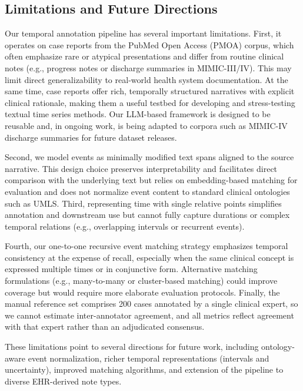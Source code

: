 \documentclass[pdflatex,sn-mathphys-num]{sn-jnl}%
\theoremstyle{thmstyleone}%
\theoremstyle{thmstyletwo}%
\theoremstyle{thmstylethree}%
\begin{document}

\subsection{Limitations and Future Directions}
\label{sec:limitations-and-future-directions}

Our temporal annotation pipeline has several important limitations. First, it operates on case reports from the PubMed Open Access (PMOA) corpus, which often emphasize rare or atypical presentations and differ from routine clinical notes (e.g., progress notes or discharge summaries in MIMIC-III/IV). This may limit direct generalizability to real-world health system documentation. At the same time, case reports offer rich, temporally structured narratives with explicit clinical rationale, making them a useful testbed for developing and stress-testing textual time series methods. Our LLM-based framework is designed to be reusable and, in ongoing work, is being adapted to corpora such as MIMIC-IV discharge summaries for future dataset releases.

Second, we model events as minimally modified text spans aligned to the source narrative. This design choice preserves interpretability and facilitates direct comparison with the underlying text but relies on embedding-based matching for evaluation and does not normalize event content to standard clinical ontologies such as UMLS. Third, representing time with single relative points simplifies annotation and downstream use but cannot fully capture durations or complex temporal relations (e.g., overlapping intervals or recurrent events).

Fourth, our one-to-one recursive event matching strategy emphasizes temporal consistency at the expense of recall, especially when the same clinical concept is expressed multiple times or in conjunctive form.  Alternative matching formulations (e.g., many-to-many or cluster-based matching) could improve coverage but would require more elaborate evaluation protocols. Finally, the manual reference set comprises 200 cases annotated by a single clinical expert, so we cannot estimate inter-annotator agreement, and all metrics reflect agreement with that expert rather than an adjudicated consensus.

These limitations point to several directions for future work, including ontology-aware event normalization, richer temporal representations (intervals and uncertainty), improved matching algorithms, and extension of the pipeline to diverse EHR-derived note types.
\end{document}
